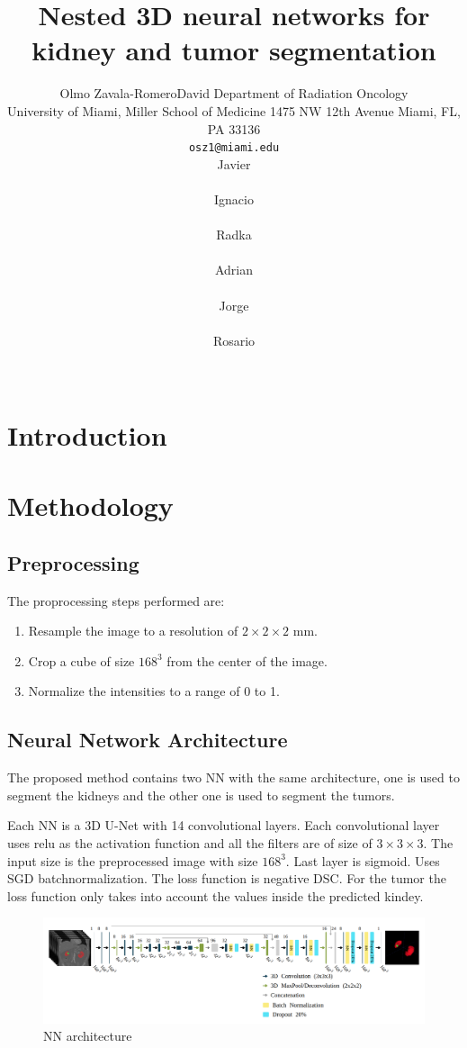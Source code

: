 \documentclass{article}
\title{Nested 3D neural networks for kidney and tumor segmentation}
\author{
  Olmo Zavala-RomeroDavid 
  Department of Radiation Oncology\\
  University of Miami, Miller School of Medicine
    1475 NW 12th Avenue
  Miami, FL, PA 33136\\
  \texttt{osz1@miami.edu} \\
  \And
  Javier \\
  \texttt{} \\
  \AND
  Ignacio\\
  \texttt{} \\
  \AND
  Radka\\
  \texttt{} \\
  \AND
  Adrian\\
  \texttt{} \\
  Jorge\\
  \texttt{} \\
  Rosario\\
  \texttt{} \\
}
\begin{document}
\maketitle

\begin{abstract}
\lipsum[1]
\end{abstract}




\section{Introduction}
\label{sec:intro}
\section{Methodology}
\label{sec:methods}

\subsection{Preprocessing}
\label{sec:prepro}
The proprocessing steps performed are:
\begin{enumerate}
    \item Resample the image to a resolution of $2 \times 2 \times 2$ mm. 
    \item Crop a cube of size $168^3$ from the center of the image. 
    \item Normalize the intensities to a range of 0 to 1.
\end{enumerate}

\subsection{Neural Network Architecture}
\label{sec:nnarc}
The proposed method contains two NN with the same architecture, one is used to segment the kidneys and the other one 
is used to segment the tumors. 

Each NN is a 3D U-Net with 14 convolutional layers. Each convolutional layer uses relu as the activation function and
all the filters are of size of $3\times 3 \times 3$. The input size is the preprocessed image with size $168^3$. 
Last layer is sigmoid.
Uses SGD batchnormalization.
The loss function is negative DSC.
For the tumor the loss function only takes into account the values inside the predicted kindey. 

\begin{figure}[h]
    \centering
    \includegraphics[totalheight=.20\textheight]{imgs/nn.png}
    \caption{NN architecture }
    \label{fig:mobile1}
\end{figure}
\end{document}
